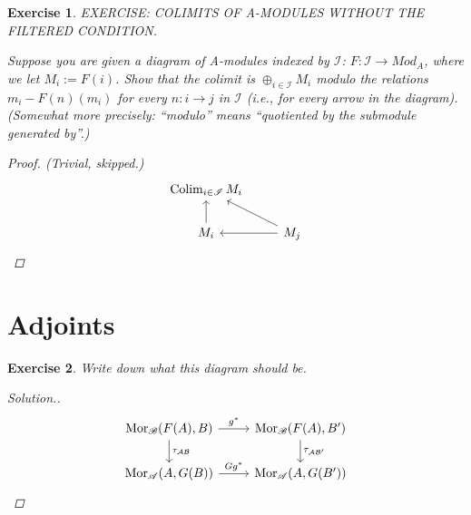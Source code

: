 \documentclass{article}
\theoremstyle{breakstyle}
\newtheorem{exercise}{Exercise}[section]
\newenvironment{solution}
  {\begin{proof}[Solution.]\renewcommand{\qedsymbol}{}}
  {\end{proof}}
\DeclareMathOperator{\mor}{Mor}
\DeclareMathOperator{\colim}{Colim}
\begin{document}
\begin{exercise}
EXERCISE: COLIMITS OF A-MODULES WITHOUT THE FILTERED CONDITION.

Suppose you are given a diagram of A-modules indexed by $\mathscr{I}$:
$F: \mathscr{I} \to Mod_A$, where we let $M_i := F(i)$. Show that the
colimit is $\oplus_{i \in \mathscr{I}} M_i$ modulo the relations
$m_i - F(n)(m_i)$ for every $n: i \to j$ in $\mathscr{I}$ (i.e., for every
arrow in the diagram). (Somewhat more precisely: ``modulo'' means
``quotiented by the submodule generated by''.)

\begin{proof}
    \emph{(Trivial, skipped.)}
    $$
        \begin{tikzcd}
        \colim_{i\in\mathscr{I}}{M_i} &                          \\
        M_i \arrow[u]                 & M_j \arrow[lu] \arrow[l]
        \end{tikzcd}
    $$
\end{proof}

\end{exercise}

\section{Adjoints}
\begin{exercise}
Write down what this diagram should be.

\begin{solution}
    $$
        \begin{tikzcd}
            {\mor_{\mathscr{B}}(F(A),B)} \arrow[r, "g^*"] \arrow[d, "\tau_{\mathcal{AB}}"] & {\mor_{\mathscr{B}}(F(A),B')} \arrow[d, "\tau_{\mathcal{AB'}}"] \\
            {\mor_{\mathscr{A}}(A,G(B))} \arrow[r, "Gg^*"]                                 & {\mor_{\mathscr{A}}(A,G(B'))}                                  
        \end{tikzcd}
    $$
\end{solution}

\end{exercise}
\end{document}
